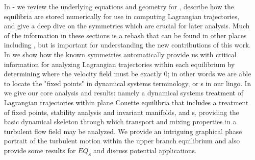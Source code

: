 In - we review the underlying equations 
and geometry for {\pCf}, describe how the equilibria are stored 
numerically for use in computing Lagrangian trajectories, and give a deep 
dive on the symmetries which are crucial for later analysis. Much of the 
information in these sections is a rehash that can be found in other 
places including \cite{GHCW07}, but is important for understanding the 
new contributions of this work.  In  we show how 
the known symmetries automatically provide us with critical information 
for analyzing Lagrangian trajectories within each equilibrium by 
determining where the velocity field must be exactly 0; in other words we 
are able to locate the "fixed points" in dynamical systems terminology, 
or {\stagp}s in our lingo. In  we give our core 
analysis and results: namely a dynamical systems treatment of Lagrangian 
trajectories within plane Couette equilibria that includes a treatment of 
fixed points, stability analysis and invariant manifolds, and {\hc}s, 
providing the basic dynamical skeleton through which transport and mixing 
properties in a turbulent flow field may be analyzed. We provide an 
intriguing graphical phase portrait of the turbulent motion within the 
upper branch equilibrium and also provide some results for $EQ_8$ and 
discuss potential applications. 

